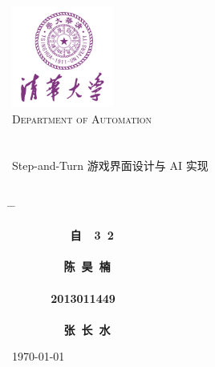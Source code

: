 


\begin{titlepage}
\begin{center}
\includegraphics[width=0.25\textwidth]{./logo.jpg}\\[1cm]
\textsc{\LARGE Department of Automation}\\[1.5cm]
\\[0.5cm]
\hrulefill
\\[0.8cm]{\centering \huge \hei Step-and-Turn 游戏界面设计与 AI 实现}\\[0.4cm]
\hrulefill
\\[4cm]

\begin{tabbing}       %

 \hspace*{5cm} \= \hspace{2.6cm} \= \kill

\>  {\centering\fs\sihao\textbf{~~~~~~~~~自~~3~2}} \\
\\
\>  {\centering\fs\sihao\textbf{~~~~~~~~陈~昊~楠}}\\
\\
\>  {\centering\fs\sihao\textbf{~~~~~~2013011449}}\\
\\
\>  {\centering\fs\sihao\textbf{~~~~~~~~张~长~水}} \\

\end{tabbing}
\vfill
{\large \today}
\end{center}
\end{titlepage}

